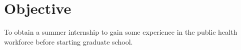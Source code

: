 
\section{Objective}
To obtain a summer internship to gain some experience in the public health workforce before starting graduate school.
\sectionsep